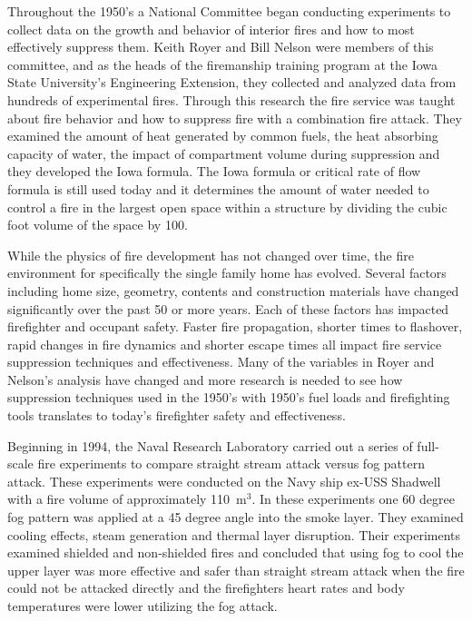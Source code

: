 \documentclass[12pt,oneside]{book}
\begin{document}
Throughout the 1950’s a National Committee began conducting experiments to collect data on the growth and behavior of interior fires and how to most effectively suppress them. Keith Royer and Bill Nelson were members of this committee, and as the heads of the firemanship training program at the Iowa State University’s Engineering Extension, they collected and analyzed data from hundreds of experimental fires. Through this research the fire service was taught about fire behavior and how to suppress fire with a combination fire attack. They examined the amount of heat generated by common fuels, the heat absorbing capacity of water, the impact of compartment volume during suppression and they developed the Iowa formula. The Iowa formula or critical rate of flow formula is still used today and it determines the amount of water needed to control a fire in the largest open space within a structure by dividing the cubic foot volume of the space by 100.

While the physics of fire development has not changed over time, the fire environment for specifically the single family home has evolved. Several factors including home size, geometry, contents and construction materials have changed significantly over the past 50 or more years. Each of these factors has impacted firefighter and occupant safety. Faster fire propagation, shorter times to flashover, rapid changes in fire dynamics and shorter escape times all impact fire service suppression techniques and effectiveness. Many of the variables in Royer and Nelson’s analysis have changed and more research is needed to see how suppression techniques used in the 1950’s with 1950’s fuel loads and firefighting tools translates to today’s firefighter safety and effectiveness.

Beginning in 1994, the Naval Research Laboratory carried out a series of full-scale fire experiments to compare straight stream attack versus fog pattern attack. These experiments were conducted on the Navy ship ex-USS Shadwell with a fire volume of approximately 110~m$^3$. In these experiments one 60 degree fog pattern was applied at a 45 degree angle into the smoke layer. They examined cooling effects, steam generation and thermal layer disruption. Their experiments examined shielded and non-shielded fires and concluded that using fog to cool the upper layer was more effective and safer than straight stream attack when the fire could not be attacked directly and the firefighters heart rates and body temperatures were lower utilizing the fog attack.
\end{document}
